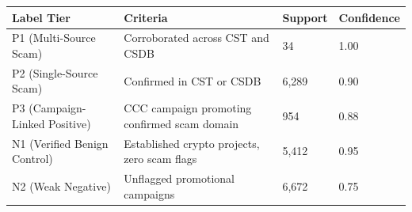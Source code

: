 \begin{tabular}{llll}
\toprule
Label Tier & Criteria & Support & Confidence \\
\midrule
P1 (Multi-Source Scam) & Corroborated across CST and CSDB & 34 & 1.00 \\
P2 (Single-Source Scam) & Confirmed in CST or CSDB & 6,289 & 0.90 \\
P3 (Campaign-Linked Positive) & CCC campaign promoting confirmed scam domain & 954 & 0.88 \\
N1 (Verified Benign Control) & Established crypto projects, zero scam flags & 5,412 & 0.95 \\
N2 (Weak Negative) & Unflagged promotional campaigns & 6,672 & 0.75 \\
\bottomrule
\end{tabular}
